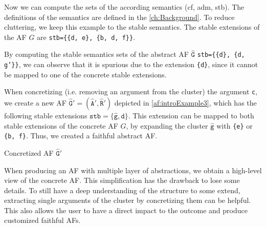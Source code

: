 Now we can compute the sets of the according semantics (cf, adm, stb). The definitions of the semantics are defined in the \cref{ch:Background}. To reduce cluttering, we keep this example to the stable semantics. The stable extensions of the AF $G$ are \texttt{stb=\{\{d, e\}, \{b, d, f\}\}}.

By computing the stable semantics sets of the abstract AF $\mathtt{\hat{G}}$ \texttt{stb=\{\{d\}, \{d, g'\}\}}, we can observe that it is spurious due to the extension \texttt{\{d\}}, since it cannot be mapped to one of the concrete stable extensions.

When concretizing (i.e. removing an argument from the cluster) the argument \texttt{c}, we create a new AF $\mathtt{\hat{G}' = (\hat{A}', \hat{R}')}$ depicted in \cref{af:introExample3}, which has the following stable extensions $\mathtt{stb=\{\hat{g}, d\}}$. This extension can be mapped to both stable extensions of the concrete AF $G$, by expanding the cluster $\mathtt{\hat{g}}$ with \texttt{\{e\}} or \texttt{\{b, f\}}. Thus, we created a faithful abstract AF.

\begin{example}[h]
    \centering
    \caption{Concretized AF $\mathtt{\hat{G}'}$}
    \label{af:introExample3}
\end{example}


When producing an AF with multiple layer of abstractions, we obtain a high-level view of the concrete AF. This simplification has the drawback to lose some details. To still have a deep understanding of the structure to some extend, extracting single arguments of the cluster by concretizing them can be helpful. This also allows the user to have a direct impact to the outcome and produce customized faithful AFs.


